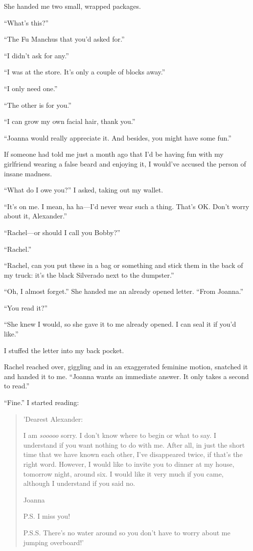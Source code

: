She handed me two small, wrapped packages.

``What's this?''

``The Fu Manchus that you'd asked for.''

``I didn't ask for any.''

``I was at the store. It's only a couple of blocks away.''

``I only need one.''

``The other is for you.''

``I can grow my own facial hair, thank you.''

``Joanna would really appreciate it. And besides, you might have some
fun.''

If someone had told me just a month ago that I'd be having fun with my
girlfriend wearing a false beard and enjoying it, I would've accused the
person of insane madness.

``What do I owe you?'' I asked, taking out my wallet.

``It's on me. I mean, ha ha---I'd never wear such a thing. That's OK.
Don't worry about it, Alexander.''

``Rachel---or should I call you Bobby?''

``Rachel.''

``Rachel, can you put these in a bag or something and stick them in the
back of my truck: it's the black Silverado next to the dumpster.''

``Oh, I almost forget.'' She handed me an already opened letter. ``From
Joanna.''

``You read it?''

``She knew I would, so she gave it to me already opened. I can seal it
if you'd like.''

I stuffed the letter into my back pocket.

Rachel reached over, giggling and in an exaggerated feminine motion,
snatched it and handed it to me. ``Joanna wants an immediate answer. It
only takes a second to read.''

``Fine.'' I started reading:

\begin{quote}
'Dearest Alexander:

I am \emph{sooooo} sorry. I don't know where to begin or what to say. I
understand if you want nothing to do with me. After all, in just the
short time that we have known each other, I've disappeared twice, if
that's the right word. However, I would like to invite you to dinner at
my house, tomorrow night, around six. I would like it very much if you
came, although I understand if you said no.

Joanna

P.S. I miss you!

P.S.S. There's no water around so you don't have to worry about me
jumping overboard!'
\end{quote}

